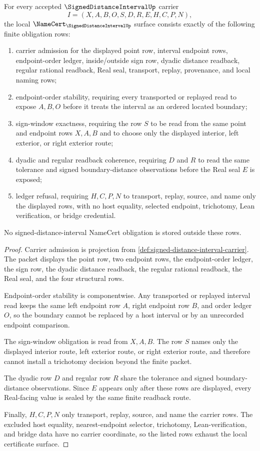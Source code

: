 \begin{theorem}
\label{thm:signed-distance-interval-namecert-obligations}
For every accepted $\SignedDistanceIntervalUp$ carrier
$$
I=(X,A,B,O,S,D,R,E,H,C,P,N),
$$
the local $\NameCert_{\SignedDistanceIntervalUp}$ surface consists exactly of the following finite obligation rows:
\begin{enumerate}
\item carrier admission for the displayed point row, interval endpoint rows, endpoint-order ledger, inside/outside sign row, dyadic distance readback, regular rational readback, Real seal, transport, replay, provenance, and local naming rows;
\item endpoint-order stability, requiring every transported or replayed read to expose $A,B,O$ before it treats the interval as an ordered located boundary;
\item sign-window exactness, requiring the row $S$ to be read from the same point and endpoint rows $X,A,B$ and to choose only the displayed interior, left exterior, or right exterior route;
\item dyadic and regular readback coherence, requiring $D$ and $R$ to read the same tolerance and signed boundary-distance observations before the Real seal $E$ is exposed;
\item ledger refusal, requiring $H,C,P,N$ to transport, replay, source, and name only the displayed rows, with no host equality, selected endpoint, trichotomy, Lean verification, or bridge credential.
\end{enumerate}
No signed-distance-interval NameCert obligation is stored outside these rows.
\end{theorem}
\begin{proof}
Carrier admission is projection from \autoref{def:signed-distance-interval-carrier}. The packet displays the point row, two endpoint rows, the endpoint-order ledger, the sign row, the dyadic distance readback, the regular rational readback, the Real seal, and the four structural rows.

Endpoint-order stability is componentwise. Any transported or replayed interval read keeps the same left endpoint row $A$, right endpoint row $B$, and order ledger $O$, so the boundary cannot be replaced by a host interval or by an unrecorded endpoint comparison.

The sign-window obligation is read from $X,A,B$. The row $S$ names only the displayed interior route, left exterior route, or right exterior route, and therefore cannot install a trichotomy decision beyond the finite packet.

The dyadic row $D$ and regular row $R$ share the tolerance and signed boundary-distance observations. Since $E$ appears only after these rows are displayed, every Real-facing value is sealed by the same finite readback route.

Finally, $H,C,P,N$ only transport, replay, source, and name the carrier rows. The excluded host equality, nearest-endpoint selector, trichotomy, Lean-verification, and bridge data have no carrier coordinate, so the listed rows exhaust the local certificate surface.
\end{proof}

